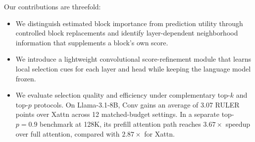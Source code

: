 Our contributions are threefold:
\begin{itemize}
    \item We distinguish estimated block importance from prediction utility
    through controlled block replacements and identify layer-dependent
    neighborhood information that supplements a block's own score.

    \item We introduce a lightweight convolutional score-refinement module
    that learns local selection cues for each layer and head while keeping
    the language model frozen.

    \item We evaluate selection quality and efficiency under complementary
    top-$k$ and top-$p$ protocols. On Llama-3.1-8B, Conv gains an average of
    3.07 RULER points over Xattn across 12 matched-budget settings. In a
    separate top-$p=0.9$ benchmark at 128K, its prefill attention path reaches
    $3.67\times$ speedup over full attention, compared with $2.87\times$
    for Xattn.
\end{itemize}
